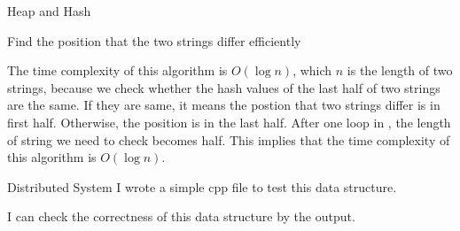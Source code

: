 \begin{homeworkProblem}{Heap and Hash}
    \begin{algorithm}[]
        \begin{algorithmic}[1]
                    \Else
                    \EndIf
                \EndWhile
            \EndFunction{}
        \end{algorithmic}
        \caption{Find the position that the two strings differ efficiently}
    \end{algorithm}
    The time complexity of this algorithm is $O(\log n)$, which $n$ is the length
    of two strings, because we check whether the hash values of the last half of 
    two strings are the same. If they are same, it means the postion that two 
    strings differ is in first half. Otherwise, the position is in the last half.
    After one loop in , the length of string we need to check becomes
    half. This implies that the time complexity of this algorithm is $O(\log n)$.


            

\end{homeworkProblem}

\begin{homeworkProblem}{Distributed System}
        I wrote a simple cpp file to test this data structure. 
        \lstset{breaklines=true}
        
        
        I can check the correctness of this data structure by the output.
        


\end{homeworkProblem}

